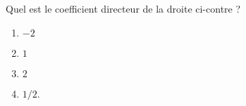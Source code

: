 
\begin{exercice}\label{exosmath-0393}

    \begin{multicols}{2}
    Quel est le coefficient directeur de la droite ci-contre ?

    \begin{multicols}{2}
        \begin{enumerate}
            \item
                \( -2\)
            \item
                \( 1\)
            \item
                \( 2\)
            \item
                \( 1/2\).
        \end{enumerate}
    \end{multicols}
    
    \columnbreak

\begin{center}

\end{center}

    \end{multicols}

\end{exercice}
